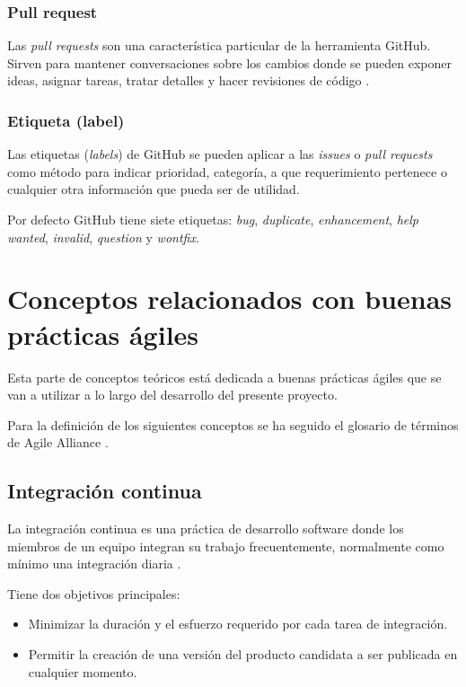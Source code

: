 \subsubsection{Pull request}

Las \emph{pull requests} son una característica particular de la herramienta GitHub. Sirven para mantener conversaciones sobre los cambios donde se pueden exponer ideas, asignar tareas, tratar detalles y hacer revisiones de código \cite{github:features}.

\subsubsection{Etiqueta (label)}

Las etiquetas (\emph{labels}) de GitHub se pueden aplicar a las \emph{issues} o \emph{pull requests} como método para indicar prioridad, categoría, a que requerimiento pertenece o cualquier otra información que pueda ser de utilidad.

Por defecto GitHub tiene siete etiquetas: \emph{bug}, \emph{duplicate}, \emph{enhancement}, \emph{help wanted}, \emph{invalid}, \emph{question} y \emph{wontfix}.

\section{Conceptos relacionados con buenas prácticas ágiles}

Esta parte de conceptos teóricos está dedicada a buenas prácticas ágiles que se van a utilizar a lo largo del desarrollo del presente proyecto.

Para la definición de los siguientes conceptos se ha seguido el glosario de términos de Agile Alliance \cite{agilealliance:glossary}.

\subsection{Integración continua}

La integración continua es una práctica de desarrollo software donde los miembros de un equipo integran su trabajo frecuentemente, normalmente como mínimo una integración diaria \cite{fowler2006continuous}.

Tiene dos objetivos principales:

\begin{itemize}
	\item Minimizar la duración y el esfuerzo requerido por cada tarea de integración.
	\item Permitir la creación de una versión del producto candidata a ser publicada en cualquier momento.
\end{itemize}


